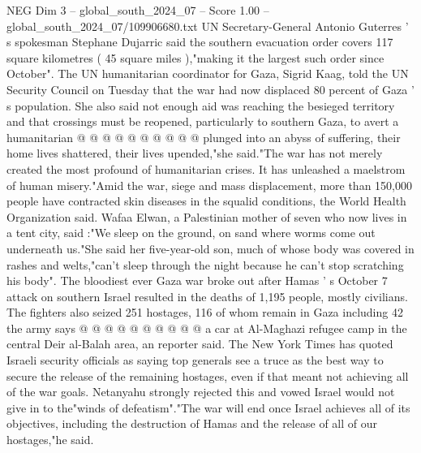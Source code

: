 \begin{textsample}{NEG Dim 3 – global\_south\_2024\_07 – Score 1.00 – global\_south\_2024\_07/109906680.txt}
UN Secretary-General Antonio Guterres ' s spokesman Stephane Dujarric said the southern evacuation order covers 117 square kilometres ( 45 square miles ),"making it the largest such order since October".
The UN humanitarian coordinator for Gaza, Sigrid Kaag, told the UN Security Council on Tuesday that the war had now displaced 80 percent of Gaza ' s population.
She also said not enough aid was reaching the besieged territory and that crossings must be reopened, particularly to southern Gaza, to avert a humanitarian @ @ @ @ @ @ @ @ @ @ plunged into an abyss of suffering, their home lives shattered, their lives upended,"she said."The war has not merely created the most profound of humanitarian crises.
It has unleashed a maelstrom of human misery."Amid the war, siege and mass displacement, more than 150,000 people have contracted skin diseases in the squalid conditions, the World Health Organization said.
Wafaa Elwan, a Palestinian mother of seven who now lives in a tent city, said :"We sleep on the ground, on sand where worms come out underneath us."She said her five-year-old son, much of whose body was covered in rashes and welts,"can't sleep through the night because he can't stop scratching his body".
The bloodiest ever Gaza war broke out after Hamas ' s October 7 attack on southern Israel resulted in the deaths of 1,195 people, mostly civilians.
The fighters also seized 251 hostages, 116 of whom remain in Gaza including 42 the army says @ @ @ @ @ @ @ @ @ @ a car at Al-Maghazi refugee camp in the central Deir al-Balah area, an reporter said.
The New York Times has quoted Israeli security officials as saying top generals see a truce as the best way to secure the release of the remaining hostages, even if that meant not achieving all of the war goals.
Netanyahu strongly rejected this and vowed Israel would not give in to the"winds of defeatism"."The war will end once Israel achieves all of its objectives, including the destruction of Hamas and the release of all of our hostages,"he said.

\end{textsample}
